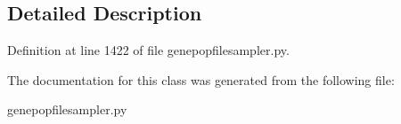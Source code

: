 \subsection{Detailed Description}


Definition at line 1422 of file genepopfilesampler.\+py.



The documentation for this class was generated from the following file\+:\begin{DoxyCompactItemize}
\item 
genepopfilesampler.\+py\end{DoxyCompactItemize}
